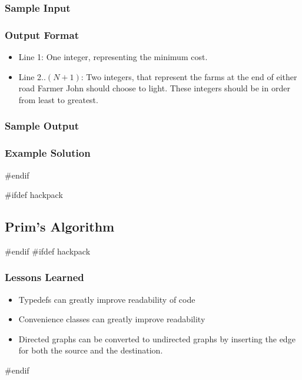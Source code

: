 \subsubsection{Sample Input}
\subsubsection{Output Format}
\begin{itemize}
	\item Line 1: One integer, representing the minimum cost.
	\item Line 2..$(N+1)$: Two integers, that represent the farms at the end of either road Farmer John should choose to light.
		These integers should be in order from least to greatest.
\end{itemize}
\subsubsection{Sample Output}
\subsubsection{Example Solution}
#endif

#ifdef hackpack
\subsection{Prim's Algorithm}
#endif
#ifdef hackpack
\subsubsection{Lessons Learned}
\begin{itemize}
	\item Typedefs can greatly improve readability of code
	\item Convenience classes can greatly improve readability
	\item Directed graphs can be converted to undirected graphs by inserting the edge for both the source and the destination.
\end{itemize}
#endif


